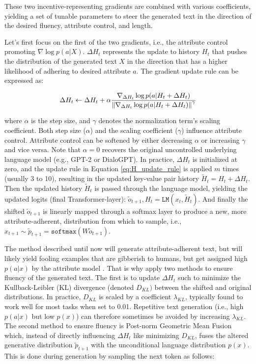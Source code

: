 These two incentive-representing gradients are combined with various coefficients, yielding a set of tunable parameters to steer the generated text in the direction of the desired fluency, attribute control, and length.

Let's first focus on the first of the two gradients, i.e., the attribute control promoting $\nabla \log p(a | X)$. $\Delta H_t$ represents the update to history $H_t$ that pushes the distribution of the generated text $X$ in the direction that has a higher likelihood of adhering to desired attribute $a$. The gradient update rule can be expressed as:

\begin{equation}
    \Delta H_t \leftarrow \Delta H_t + \alpha
    \frac{\nabla_{\Delta H_t} \log p(a | H_t + \Delta H_t)}
    {\norm{\nabla_{\Delta H_t} \log p(a | H_t + \Delta H_t)}^{\gamma}}
\label{eq:H_update_rule}
\end{equation}

where $\alpha$ is the step size, and $\gamma$ denotes the normalization term's scaling coefficient. Both step size ($\alpha$) and the scaling coefficient ($\gamma$) influence attribute control. Attribute control can be softened by either decreasing $\alpha$ or increasing $\gamma$ and vice versa. Note that $\alpha = 0$ recovers the original uncontrolled underlying language model (e.g., GPT-2 or DialoGPT). In practice, $\Delta H_t$ is initialized at zero, and the update rule in Equation \ref{eq:H_update_rule} is applied $m$ times (usually 3 to 10), resulting in the updated key-value pair history $\tilde{H}_t  = H_t + \Delta H_t$. Then the updated history $\tilde{H}_t$ is passed through the language model, yielding the updated logits (final Transformer-layer): $\tilde{o}_{t + 1}, H_t = \texttt{LM}(x_t, \tilde{H}_t)$. And finally the shifted $\tilde{o}_{t + 1}$ is linearly mapped through a softmax layer to produce a new, more attribute-adherent, distribution from which to sample, i.e., $x_{t + 1} \sim \tilde{p}_{t + 1} = \texttt{softmax} \left( W \tilde{o}_{t + 1} \right)$.

The method described until now will generate attribute-adherent text, but will likely yield fooling examples \citep{nguyen2015deep} that are gibberish to humans, but get assigned high $p(a | x)$ by the attribute model \citep{dathathri2019plug}. That is why \cite{dathathri2019plug} apply two methods to ensure fluency of the generated text. The first is to update $\Delta H_t$ such to minimize the Kullback-Leibler (KL) divergence (denoted $D_{KL})$ between the shifted and original distributions. In practice, $D_{KL}$ is scaled by a coefficient $\lambda_{KL}$, typically found to work well for most tasks when set to 0.01. Repetitive text generation (i.e., high $p(a | x)$ but low $p(x)$) can therefore sometimes be avoided by increasing $\lambda_{KL}$. The second method to ensure fluency is Post-norm Geometric Mean Fusion \citep{stahlberg-etal-2018-simple} which, instead of directly influencing $\Delta H_t$ like minimizing $D_{KL}$, fuses the altered generative distribution $\tilde{p}_{t + 1}$ with the unconditional language distribution $p(x)$. This is done during generation by sampling the next token as follows:

